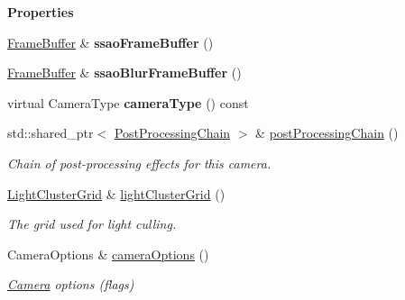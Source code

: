 \begin{Indent}\textbf{ Properties}\par
\begin{DoxyCompactItemize}
\item 
\mbox{\label{classrev_1_1_scene_camera_a13ac56f239e962a6f0368b57cd22bff1}} 
\mbox{\hyperlink{classrev_1_1_frame_buffer}{Frame\+Buffer}} \& {\bfseries ssao\+Frame\+Buffer} ()
\item 
\mbox{\label{classrev_1_1_scene_camera_a872c3606a8196a1359c1470e6b2ce78c}} 
\mbox{\hyperlink{classrev_1_1_frame_buffer}{Frame\+Buffer}} \& {\bfseries ssao\+Blur\+Frame\+Buffer} ()
\item 
\mbox{\label{classrev_1_1_scene_camera_a6fbc9aa70b33dfd1785779fa346e72cc}} 
virtual Camera\+Type {\bfseries camera\+Type} () const
\item 
\mbox{\label{classrev_1_1_scene_camera_ae0aa73999ac259ea6a276f3e6e7963e0}} 
std\+::shared\+\_\+ptr$<$ \mbox{\hyperlink{classrev_1_1_post_processing_chain}{Post\+Processing\+Chain}} $>$ \& \mbox{\hyperlink{classrev_1_1_scene_camera_ae0aa73999ac259ea6a276f3e6e7963e0}{post\+Processing\+Chain}} ()
\begin{DoxyCompactList}\small\item\em Chain of post-\/processing effects for this camera. \end{DoxyCompactList}\item 
\mbox{\label{classrev_1_1_scene_camera_af849655f309b43dc6198edf0e1b36cdb}} 
\mbox{\hyperlink{classrev_1_1_light_cluster_grid}{Light\+Cluster\+Grid}} \& \mbox{\hyperlink{classrev_1_1_scene_camera_af849655f309b43dc6198edf0e1b36cdb}{light\+Cluster\+Grid}} ()
\begin{DoxyCompactList}\small\item\em The grid used for light culling. \end{DoxyCompactList}\item 
\mbox{\label{classrev_1_1_scene_camera_abd48f1055bd9980ceead2dd19080bcf4}} 
Camera\+Options \& \mbox{\hyperlink{classrev_1_1_scene_camera_abd48f1055bd9980ceead2dd19080bcf4}{camera\+Options}} ()
\begin{DoxyCompactList}\small\item\em \mbox{\hyperlink{classrev_1_1_camera}{Camera}} options (flags) \end{DoxyCompactList}\item 

\end{DoxyCompactItemize}
\end{Indent}
